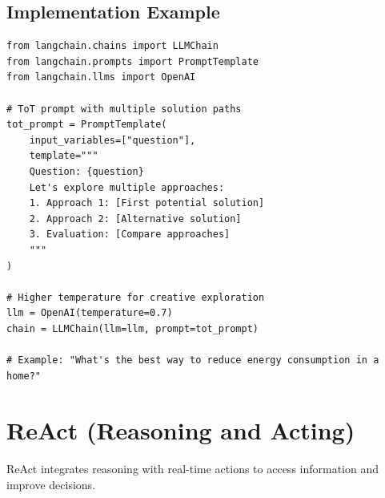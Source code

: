 \documentclass[12pt,letterpaper]{article}
\newenvironment{macterminal}{%
    \begin{mdframed}[
        linecolor=terminalFrame,
        backgroundcolor=terminalBg,
        roundcorner=5pt,
        skipabove=5pt,
        skipbelow=5pt,
        linewidth=1pt,
        innertopmargin=5pt,
        frametitle={%
            \tikz[baseline=(current bounding box.east), outer sep=0pt]{
                \fill[red!80!black] (0,0) circle (5pt);
                \fill[yellow!80!black] (0.7,0) circle (5pt);
                \fill[green!70!black] (1.4,0) circle (5pt);
            }
        },
        frametitlealignment=\raggedright,
        frametitleaboveskip=8pt,
        frametitlebelowskip=0pt,
    ]
}{%
    \end{mdframed}%
}
\begin{document}
\subsection{Implementation Example}

\begin{macterminal}
\begin{lstlisting}
from langchain.chains import LLMChain
from langchain.prompts import PromptTemplate
from langchain.llms import OpenAI

# ToT prompt with multiple solution paths
tot_prompt = PromptTemplate(
    input_variables=["question"],
    template="""
    Question: {question}
    Let's explore multiple approaches:
    1. Approach 1: [First potential solution]
    2. Approach 2: [Alternative solution]
    3. Evaluation: [Compare approaches]
    """
)

# Higher temperature for creative exploration
llm = OpenAI(temperature=0.7)
chain = LLMChain(llm=llm, prompt=tot_prompt)

# Example: "What's the best way to reduce energy consumption in a home?"
\end{lstlisting}
\end{macterminal}

\section{ReAct (Reasoning and Acting)}

ReAct integrates reasoning with real-time actions to access information and improve decisions.
\end{document}
